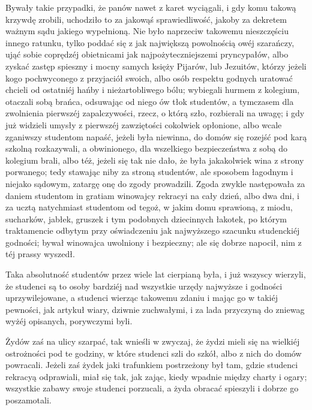 \documentclass{book}
\begin{document}
Bywały takie przypadki, że panów nawet z karet wyciągali, i gdy komu takową krzywdę zrobili, uchodziło to za jakowąś sprawiedliwość, jakoby za dekretem ważnym sądu jakiego wypełnioną. Nie było naprzeciw takowemu nieszczęściu innego ratunku, tylko poddać się z jak największą powolnością owéj szarańczy, ująć sobie coprędzéj obietnicami jak najpożyteczniejszemi pryncypałów, albo zyskać zastęp spieszny i mocny samych księży Pijarów, lub Jezuitów, którzy jeżeli kogo pochwyconego z przyjaciół swoich, albo osób respektu godnych uratować chcieli od ostatniéj hańby i nieżartobliwego bólu; wybiegali hurmem z kolegium, otaczali sobą brańca, odsuwając od niego ów tłok studentów, a tymczasem dla zwolnienia pierwszéj zapalczywości, rzecz, o którą szło, rozbierali na uwagę; i gdy już widzieli umysły z pierwszéj zawziętości cokolwiek opłonione, albo wcale zganiwszy studentom napaść, jeżeli była niewinna, do domów się rozejść pod karą szkolną rozkazywali, a obwinionego, dla wszelkiego bezpieczeństwa z sobą do kolegium brali, albo téż, jeżeli się tak nie dało, że była jakakolwiek wina z strony porwanego; tedy stawając niby za stroną studentów, ale sposobem łagodnym i niejako sądowym, zatargę onę do zgody prowadzili. Zgoda zwykle następowała za daniem studentom in gratiam winowajcy rekracyi na cały dzień, albo dwa dni, i za ucztą natychmiast studentom od tegoż, w jakim domu sprawioną, z miodu, sucharków, jabłek, gruszek i tym podobnych dziecinnych łakotek, po którym traktamencie odbytym przy oświadczeniu jak najwyższego szacunku studenckiéj godności; bywał winowajca uwolniony i bezpieczny; ale się dobrze napocił, nim z téj prassy wyszedł.

Taka absolutność studentów przez wiele lat cierpianą była, i już wszyscy wierzyli, że studenci są to osoby bardziéj nad wszystkie urzędy najwyższe i godności uprzywilejowane, a studenci wierząc takowemu zdaniu i mając go w takiéj pewności, jak artykuł wiary, dziwnie zuchwałymi, i za lada przyczyną do zniewag wyżéj opisanych, porywczymi byli.

Żydów zaś na ulicy szarpać, tak wnieśli w zwyczaj, że żydzi mieli się na wielkiéj ostrożności pod te godziny, w które studenci szli do szkół, albo z nich do domów powracali. Jeżeli zaś żydek jaki trafunkiem postrzeżony był tam, gdzie studenci rekracyą odprawiali, miał się tak, jak zając, kiedy wpadnie między charty i ogary; wszystkie zabawy swoje studenci porzucali, a żyda obracać spieszyli i dobrze go poszamotali.
\end{document}
